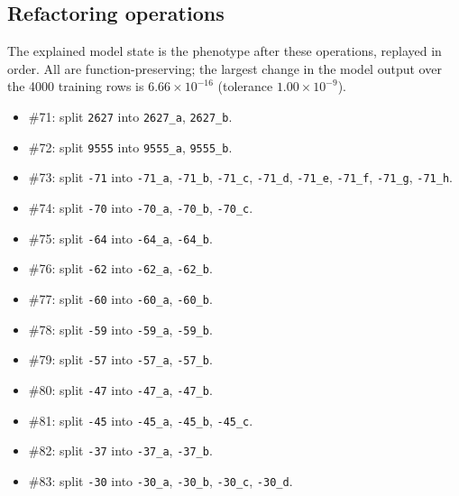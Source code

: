 \begin{drafted}
\subsection{Refactoring operations}\label{app:churn100-s2-c1:operations}
The explained model state is the phenotype after these operations, replayed in order. All are function-preserving; the largest change in the model output over the 4000 training rows is $6.66\times 10^{-16}$ (tolerance $1.00\times 10^{-9}$).
\begin{itemize}
\item \#71: split \texttt{2627} into \texttt{2627\_\allowbreak{}a}, \texttt{2627\_\allowbreak{}b}.
\item \#72: split \texttt{9555} into \texttt{9555\_\allowbreak{}a}, \texttt{9555\_\allowbreak{}b}.
\item \#73: split \texttt{-71} into \texttt{-71\_\allowbreak{}a}, \texttt{-71\_\allowbreak{}b}, \texttt{-71\_\allowbreak{}c}, \texttt{-71\_\allowbreak{}d}, \texttt{-71\_\allowbreak{}e}, \texttt{-71\_\allowbreak{}f}, \texttt{-71\_\allowbreak{}g}, \texttt{-71\_\allowbreak{}h}.
\item \#74: split \texttt{-70} into \texttt{-70\_\allowbreak{}a}, \texttt{-70\_\allowbreak{}b}, \texttt{-70\_\allowbreak{}c}.
\item \#75: split \texttt{-64} into \texttt{-64\_\allowbreak{}a}, \texttt{-64\_\allowbreak{}b}.
\item \#76: split \texttt{-62} into \texttt{-62\_\allowbreak{}a}, \texttt{-62\_\allowbreak{}b}.
\item \#77: split \texttt{-60} into \texttt{-60\_\allowbreak{}a}, \texttt{-60\_\allowbreak{}b}.
\item \#78: split \texttt{-59} into \texttt{-59\_\allowbreak{}a}, \texttt{-59\_\allowbreak{}b}.
\item \#79: split \texttt{-57} into \texttt{-57\_\allowbreak{}a}, \texttt{-57\_\allowbreak{}b}.
\item \#80: split \texttt{-47} into \texttt{-47\_\allowbreak{}a}, \texttt{-47\_\allowbreak{}b}.
\item \#81: split \texttt{-45} into \texttt{-45\_\allowbreak{}a}, \texttt{-45\_\allowbreak{}b}, \texttt{-45\_\allowbreak{}c}.
\item \#82: split \texttt{-37} into \texttt{-37\_\allowbreak{}a}, \texttt{-37\_\allowbreak{}b}.
\item \#83: split \texttt{-30} into \texttt{-30\_\allowbreak{}a}, \texttt{-30\_\allowbreak{}b}, \texttt{-30\_\allowbreak{}c}, \texttt{-30\_\allowbreak{}d}.

\end{itemize}
\end{drafted}
